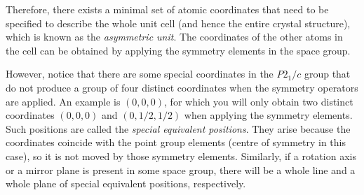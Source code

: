 \documentclass{article}
\theoremstyle{plain}\theoremheaderfont{\normalfont\itshape}\theorembodyfont{\rmfamily}\theoremseparator{.}\newtheorem*{rem}{Remark}\newtheorem*{ex}{Example}\newtheorem*{proof}{Proof}\newtheorem*{altp}{Alternative proof}
\theoremstyle{plain}\theoremheaderfont{\normalfont\bfseries}\theorembodyfont{\rmfamily}\theoremseparator{.}\newtheorem{thm}{Theorem}[section]\newtheorem{lem}[thm]{Lemma}\newtheorem{prop}[thm]{Proposition}\newtheorem*{cor}{Corollary}\newtheorem{defn}[thm]{Definition}\newtheorem{clm}[thm]{Claim}\newtheorem{clminproof}{Claim}\newtheorem*{law}{Law}\newtheorem{pos}[thm]{Postulate}
\theoremstyle{break}\theoremheaderfont{\normalfont\itshape}\theorembodyfont{\rmfamily}\theoremseparator{.\medskip}\newtheorem*{proofskip}{Proof}\newtheorem*{exs}{Examples}\newtheorem*{rems}{Remarks}
\theoremstyle{break}\theoremheaderfont{\normalfont\bfseries}\theorembodyfont{\rmfamily}\theoremseparator{.\medskip}\newtheorem{lemskip}[thm]{Lemma}\newtheorem{defnskip}[thm]{Definition}\newtheorem{propskip}[thm]{Proposition}\newtheorem{thmskip}[thm]{Theorem}
\numberwithin{equation}{section}
\begin{document}
    Therefore, there exists a minimal set of atomic coordinates that need to be specified to describe the whole unit cell (and hence the entire crystal structure), which is known as the \textit{asymmetric unit}. The coordinates of the other atoms in the cell can be obtained by applying the symmetry elements in the space group.

    However, notice that there are some special coordinates in the \(P2_1/c\) group that do not produce a group of four distinct coordinates when the symmetry operators are applied. An example is \((0,0,0)\), for which you will only obtain two distinct coordinates \((0,0,0)\) and \((0,1/2,1/2)\) when applying the symmetry elements. Such positions are called the \textit{special equivalent positions}. They arise because the coordinates coincide with the point group elements (centre of symmetry in this case), so it is not moved by those symmetry elements. Similarly, if a rotation axis or a mirror plane is present in some space group, there will be a whole line and a whole plane of special equivalent positions, respectively.
\end{document}
